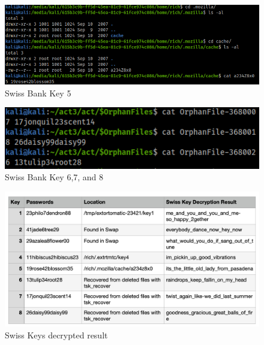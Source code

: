 \documentclass[a4paper,12pt]{article}
\begin{document}
\begin{figure}[H]
	\begin{center}
		\includegraphics[scale = 0.50]{img/act1/key5.png} 
	\end{center}
	\caption{Swiss Bank Key 5}
	\label{key5}
\end{figure}

\begin{figure}[H]
	\begin{center}
		\includegraphics[scale = 0.65]{img/act1/key678.png} 
	\end{center}
	\caption{Swiss Bank Key 6,7, and 8}
	\label{key678}
\end{figure}

\begin{figure}[H]
	\begin{center}
		\includegraphics[scale = 0.75]{img/act1/result.png} 
	\end{center}
	\caption{Swiss Keys decrypted result}
	\label{decrypted}
\end{figure}
\end{document}
